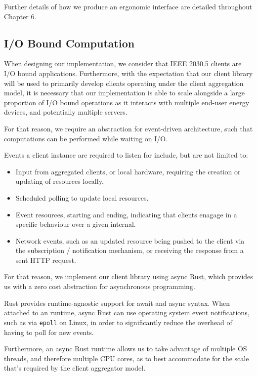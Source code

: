 Further details of how we produce an ergonomic interface are detailed throughout Chapter 6.

\subsection{I/O Bound Computation}
When designing our implementation, we consider that IEEE 2030.5 clients are I/O bound applications. Furthermore, with the expectation that our client library will be used to primarily develop clients operating under the client aggregation model, it is necessary that our implementation is able to scale alongside a large proportion of I/O bound operations as it interacts with multiple end-user energy devices, and potentially multiple servers.

For that reason, we require an abstraction for event-driven architecture, such that computations can be performed while waiting on I/O.

Events a client instance are required to listen for include, but are not limited to:

\begin{itemize}
    \item Input from aggregated clients, or local hardware, requiring the creation or updating of resources locally.
    \item Scheduled polling to update local resources.
    \item Event resources, starting and ending, indicating that clients enagage in a specific behaviour over a given internal.
    \item Network events, such as an updated resource being pushed to the client via the subscription / notification mechanism, or receiving the response from a sent HTTP request.
\end{itemize}

For that reason, we implement our client library using async Rust, which provides us with a zero cost abstraction for asynchronous programming.

Rust provides runtime-agnostic support for await and async syntax.
When attached to an runtime, async Rust can use operating system event notifications, such as via \texttt{epoll} on Linux, in order to significantly reduce the overhead of having to poll for new events.

Furthermore, an async Rust runtime allows us to take advantage of multiple OS threads, and therefore multiple CPU cores, as to best accommodate for the scale that's required by the client aggregator model.


